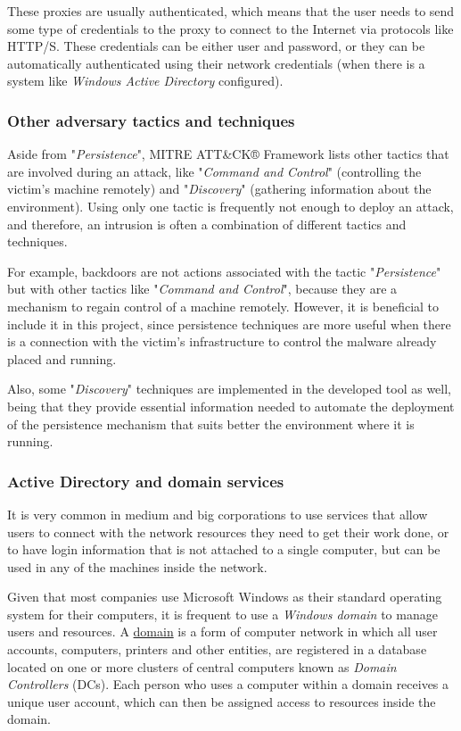 \pagebreak
These proxies are usually authenticated, which means that the user needs to send some type of credentials to the proxy to connect to the Internet via protocols like HTTP/S. These credentials can be either user and password, or they can be automatically authenticated using their network credentials (when there is a system like \textit{Windows Active Directory} configured).

\subsubsection{Other adversary tactics and techniques}
\label{sssec:otherTactics}

Aside from "\textit{Persistence}", MITRE ATT\&CK® Framework lists other tactics that are involved during an attack, like "\textit{Command and Control}" (controlling the victim's machine remotely) and "\textit{Discovery}" (gathering information about the environment). Using only one tactic is frequently not enough to deploy an attack, and therefore, an intrusion is often a combination of different tactics and techniques.

For example, backdoors are not actions associated with the tactic "\textit{Persistence}" but with other tactics like "\textit{Command and Control}", because they are a mechanism to regain control of a machine remotely. However, it is beneficial to include it in this project, since persistence techniques are more useful when there is a connection with the victim's infrastructure to control the malware already placed and running.

Also, some "\textit{Discovery}" techniques are implemented in the developed tool as well, being that they provide essential information needed to automate the deployment of the persistence mechanism that suits better the environment where it is running.

\subsubsection{Active Directory and domain services}
\label{sssec:adContext}

It is very common in medium and big corporations to use services that allow users to connect with the network resources they need to get their work done, or to have login information that is not attached to a single computer, but can be used in any of the machines inside the network. 

Given that most companies use Microsoft Windows as their standard operating system for their computers, it is frequent to use a \textit{Windows domain} to manage users and resources. A \underline{domain} is a form of computer network in which all user accounts, computers, printers and other entities, are registered in a database located on one or more clusters of central computers known as \textit{Domain Controllers} (DCs). Each person who uses a computer within a domain receives a unique user account, which can then be assigned access to resources inside the domain.

